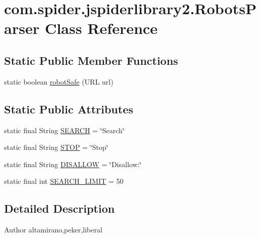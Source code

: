 \hypertarget{classcom_1_1spider_1_1jspiderlibrary2_1_1_robots_parser}{\section{com.\-spider.\-jspiderlibrary2.\-Robots\-Parser \-Class \-Reference}
\label{classcom_1_1spider_1_1jspiderlibrary2_1_1_robots_parser}
}
\subsection*{\-Static \-Public \-Member \-Functions}
\begin{DoxyCompactItemize}
\item 
static boolean \hyperlink{classcom_1_1spider_1_1jspiderlibrary2_1_1_robots_parser_a763eb021063080b7cbfc3a0477b89b38}{robot\-Safe} (\-U\-R\-L url)
\end{DoxyCompactItemize}
\subsection*{\-Static \-Public \-Attributes}
\begin{DoxyCompactItemize}
\item 
static final \-String \hyperlink{classcom_1_1spider_1_1jspiderlibrary2_1_1_robots_parser_a0455347c6ace914cb64885d5cb4e051b}{\-S\-E\-A\-R\-C\-H} = \char`\"{}\-Search\char`\"{}
\item 
static final \-String \hyperlink{classcom_1_1spider_1_1jspiderlibrary2_1_1_robots_parser_aff7a48bec0d0fa25e624afcc60144f32}{\-S\-T\-O\-P} = \char`\"{}\-Stop\char`\"{}
\item 
static final \-String \hyperlink{classcom_1_1spider_1_1jspiderlibrary2_1_1_robots_parser_a0d4b2f94e6784a8bff783928ef5d5a78}{\-D\-I\-S\-A\-L\-L\-O\-W} = \char`\"{}\-Disallow\-:\char`\"{}
\item 
static final int \hyperlink{classcom_1_1spider_1_1jspiderlibrary2_1_1_robots_parser_ad78a55ba0cb474ee527ee4c2a73c3923}{\-S\-E\-A\-R\-C\-H\-\_\-\-L\-I\-M\-I\-T} = 50
\end{DoxyCompactItemize}


\subsection{\-Detailed \-Description}
\begin{DoxyAuthor}{\-Author}
altamirano,peker,liberal 
\end{DoxyAuthor}


